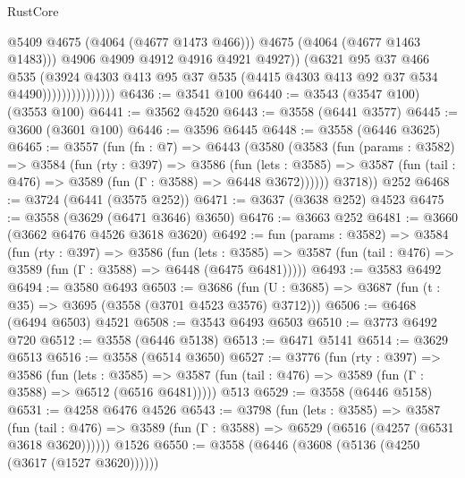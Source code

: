 \begin{lexlean}{RustCore}
\begin{coremodule}
                                    @5409
                                    @4675
                                    (@4064 (@4677 @1473 @466)))
                                  @4675
                                  (@4064 (@4677 @1463 @1483)))
                                @4906
                                @4909
                                @4912
                                @4916
                                @4921
                                @4927))
                            (@6321
                              @95
                              @37
                              @466
                              @535
                              (@3924
                                @4303
                                @413
                                @95
                                @37
                                @535
                                (@4415 @4303 @413 @92 @37 @534 @4490)))))))))))))))
@6436 := @3541 @100
@6440 := @3543 (@3547 @100) (@3553 @100)
@6441 := @3562 @4520
@6443 := @3558 (@6441 @3577)
@6445 := @3600 (@3601 @100)
@6446 := @3596 @6445
@6448 := @3558 (@6446 @3625)
@6465 := @3557
    (fun (fn : @7) =>
    @6443
      (@3580
        (@3583
          (fun (params : @3582) =>
          @3584
            (fun (rty : @397) =>
            @3586
              (fun (lets : @3585) =>
              @3587 (fun (tail : @476) => @3589 (fun (Γ : @3588) => @6448 @3672))))))
        @3718))
    @252
@6468 := @3724 (@6441 (@3575 @252))
@6471 := @3637 (@3638 @252) @4523
@6475 := @3558 (@3629 (@6471 @3646) @3650)
@6476 := @3663 @252
@6481 := @3660 (@3662 @6476 @4526 @3618 @3620)
@6492 := fun (params : @3582) =>
  @3584
    (fun (rty : @397) =>
    @3586
      (fun (lets : @3585) =>
      @3587 (fun (tail : @476) => @3589 (fun (Γ : @3588) => @6448 (@6475 @6481)))))
@6493 := @3583 @6492
@6494 := @3580 @6493
@6503 := @3686 (fun (U : @3685) => @3687 (fun (t : @35) => @3695 (@3558 (@3701 @4523 @3576) @3712)))
@6506 := @6468 (@6494 @6503) @4521
@6508 := @3543 @6493 @6503
@6510 := @3773 @6492 @720
@6512 := @3558 (@6446 @5138)
@6513 := @6471 @5141
@6514 := @3629 @6513
@6516 := @3558 (@6514 @3650)
@6527 := @3776
    (fun (rty : @397) =>
    @3586
      (fun (lets : @3585) =>
      @3587 (fun (tail : @476) => @3589 (fun (Γ : @3588) => @6512 (@6516 @6481)))))
    @513
@6529 := @3558 (@6446 @5158)
@6531 := @4258 @6476 @4526
@6543 := @3798
    (fun (lets : @3585) =>
    @3587
      (fun (tail : @476) => @3589 (fun (Γ : @3588) => @6529 (@6516 (@4257 (@6531 @3618 @3620))))))
    @1526
@6550 := @3558 (@6446 (@3608 (@5136 (@4250 (@3617 (@1527 @3620))))))

\end{coremodule}
\end{lexlean}
